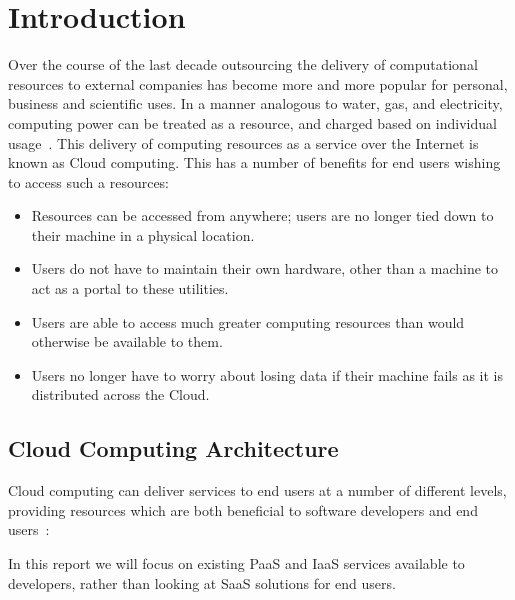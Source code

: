 \chapter{Introduction}
Over the course of the last decade outsourcing the delivery of computational resources to external companies has become more and more popular for personal, business and scientific uses. In a manner analogous to water, gas, and electricity, computing power can be treated as a resource, and charged based on individual usage~\cite{Aneka}. This delivery of computing resources as a service over the Internet is known as Cloud computing. This has a number of benefits for end users wishing to access such a resources:
\begin{itemize}
\item Resources can be accessed from anywhere; users are no longer tied down to their machine in a physical location.
\item Users do not have to maintain their own hardware, other than a machine to act as a portal to these utilities.
\item Users are able to access much greater computing resources than would otherwise be available to them.
\item Users no longer have to worry about losing data if their machine fails as it is distributed across the Cloud.
\end{itemize}

\section{Cloud Computing Architecture}
Cloud computing can deliver services to end users at a number of different levels, providing resources which are both beneficial to software developers and end users~\cite{Aneka}:
\begin{itemize}
\end{itemize}

In this report we will focus on existing PaaS and IaaS services available to developers, rather than looking at SaaS solutions for end users.
